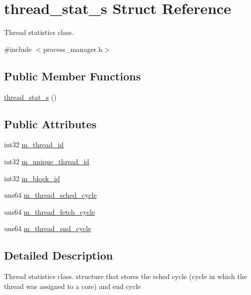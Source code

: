\hypertarget{structthread__stat__s}{
\section{thread\_\-stat\_\-s Struct Reference}
\label{structthread__stat__s}
}


Thread statistics class.  




{\ttfamily \#include $<$process\_\-manager.h$>$}

\subsection*{Public Member Functions}
\begin{DoxyCompactItemize}
\item 
\hyperlink{structthread__stat__s_a720c46384903b933a5bbd988e463f2c9}{thread\_\-stat\_\-s} ()
\end{DoxyCompactItemize}
\subsection*{Public Attributes}
\begin{DoxyCompactItemize}
\item 
int32 \hyperlink{structthread__stat__s_a73159fa4a36b03ae2affe98e351a3c14}{m\_\-thread\_\-id}
\item 
int32 \hyperlink{structthread__stat__s_a9422613d9040a649e0dbc709222194cc}{m\_\-unique\_\-thread\_\-id}
\item 
int32 \hyperlink{structthread__stat__s_aeed9fab1f2482c5e5c8596701fe9ad59}{m\_\-block\_\-id}
\item 
uns64 \hyperlink{structthread__stat__s_ae566a7e5f2c647c9fcae9d6699f4263d}{m\_\-thread\_\-sched\_\-cycle}
\item 
uns64 \hyperlink{structthread__stat__s_abb0486417fb29d4f3bd94afd3d26cd44}{m\_\-thread\_\-fetch\_\-cycle}
\item 
uns64 \hyperlink{structthread__stat__s_afce91d61a581f23a661f057cf0e535a6}{m\_\-thread\_\-end\_\-cycle}
\end{DoxyCompactItemize}


\subsection{Detailed Description}
Thread statistics class. structure that stores the sched cycle (cycle in which the thread was assigned to a core) and end cycle 

